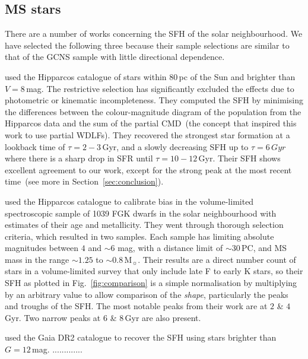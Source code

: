 \documentclass[fleqn,usenatbib]{mnras}
\begin{document}
\subsection{MS stars}
There are a number of works concerning the SFH of the solar neighbourhood. We
have selected the following three because their sample selections are similar
to that of the GCNS sample with little directional dependence.

\citet{2006A&A...459..783C} used the Hipparcos catalogue of stars within 80\,pc
of the Sun and brighter than $V=8$\,mag. The restrictive selection has
significantly excluded the effects due to photometric or kinematic
incompleteness. They computed the SFH by minimising the differences between the
colour-magnitude diagram of the population from the Hipparcos data and the
sum of the partial CMD~(the concept that inspired this work to use partial
WDLFs). They recovered the strongest star formation at a lookback time of
$\tau=2-3$\,Gyr, and a slowly decreasing SFH up to $\tau=6\,Gyr$ where there is
a sharp drop in SFR until $\tau=10-12$\,Gyr. Their SFH shows excellent agreement
to our work, except for the strong peak at the most recent time~(see more in
Section~\ref{sec:conclusion}).

\citet{2007ApJ...665..767R} used the Hipparcos catalogue to calibrate
bias in the \citep{2005ApJS..159..141V} volume-limited spectroscopic
sample of 1039 FGK dwarfs in the solar neighbourhood with estimates of
their age and metallicity. They went through thorough selection criteria,
which resulted in two samples. Each sample has limiting absolute magnitudes
between $4$ and $\sim$6 mag, with a distance limit of $\sim$30\,PC, and MS mass
in the range $\sim1.25$ to $\sim0.8$\,M$_{\sun}$. Their results are a direct
number count of stars in a volume-limited survey that only include late F to
early K stars, so their SFH as plotted in Fig.~\ref{fig:comparison} is a simple
normalisation by multiplying by an arbitrary value to allow comparison of the
\textit{shape}, particularly the peaks and troughs of the SFH. The most notable
peaks from their work are at $2$ \& $4$\,Gyr. Two narrow peaks at $6$ \&
$8$\,Gyr are also present.

\citet{2019A&A...624L...1M} used the Gaia DR2 catalogue to recover the SFH
using stars brighter than $G=12$\,mag. .............
\end{document}
